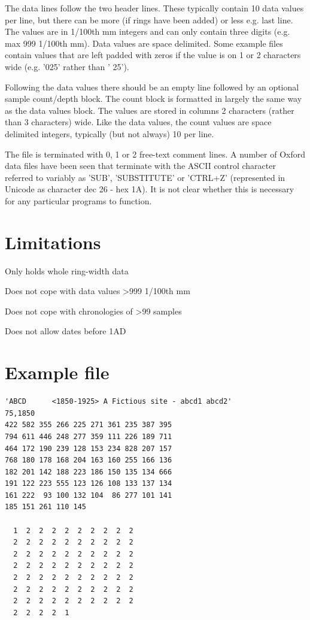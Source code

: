 The data lines follow the two header lines. These typically contain 10 data values per line, but there can be more (if rings have been added) or less e.g. last line. The values are in 1/100th mm integers and can only contain three digits (e.g. max 999 1/100th mm). Data values are space delimited. Some example files contain values that are left padded with zeros if the value is on 1 or 2 characters wide (e.g. '025' rather than ' 25').

Following the data values there should be an empty line followed by an optional sample count/depth block. The count block is formatted in largely the same way as the data values block. The values are stored in columns 2 characters (rather than 3 characters) wide. Like the data values, the count values are space delimited integers, typically (but not always) 10 per line.

The file is terminated with 0, 1 or 2 free-text comment lines. A number of Oxford data files have been seen that terminate with the ASCII control character referred to variably as 'SUB', 'SUBSTITUTE' or 'CTRL+Z' (represented in Unicode as character dec 26 - hex 1A). It is not clear whether this is necessary for any particular programs to function. 

\section{Limitations}

\begin{itemize*}
 \item Only holds whole ring-width data
 \item Does not cope with data values >999 1/100th mm
 \item Does not cope with chronologies of >99 samples
 \item Does not allow dates before 1AD
\end{itemize*}

\newpage
\section{Example file}

\begin{lstlisting}
'ABCD      <1850-1925> A Fictious site - abcd1 abcd2'
75,1850 
422 582 355 266 225 271 361 235 387 395 
794 611 446 248 277 359 111 226 189 711 
464 172 190 239 128 153 234 828 207 157 
768 180 178 168 204 163 160 255 166 136 
182 201 142 188 223 186 150 135 134 666 
191 122 223 555 123 126 108 133 137 134 
161 222  93 100 132 104  86 277 101 141 
185 151 261 110 145 

  1  2  2  2  2  2  2  2  2  2
  2  2  2  2  2  2  2  2  2  2
  2  2  2  2  2  2  2  2  2  2
  2  2  2  2  2  2  2  2  2  2
  2  2  2  2  2  2  2  2  2  2
  2  2  2  2  2  2  2  2  2  2
  2  2  2  2  2  2  2  2  2  2
  2  2  2  2  1
\end{lstlisting}


